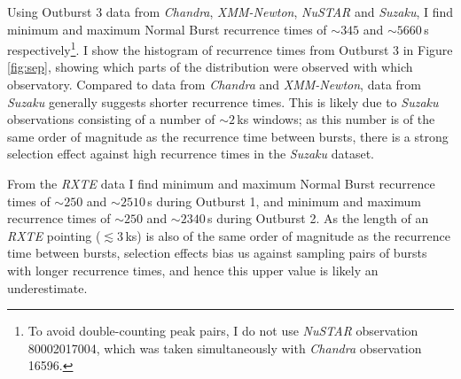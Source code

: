\par Using Outburst 3 data from \indexchandra\textit{Chandra}, \indexxmm\textit{XMM-Newton}, \indexnustar\textit{NuSTAR} and \indexsuzaku\textit{Suzaku}, I find minimum and maximum Normal Burst recurrence times of $\sim345$ and $\sim5660$\,s respectively\footnote{To avoid double-counting peak pairs, I do not use \textit{NuSTAR} observation 80002017004, which was taken simultaneously with \textit{Chandra} observation 16596.}.  I show the histogram of recurrence times from Outburst 3 in Figure \ref{fig:sep}, showing which parts of the distribution were observed with which observatory.  Compared to data from \textit{Chandra} and \textit{XMM-Newton}, data from \textit{Suzaku} generally suggests shorter recurrence times.  This is likely due to \textit{Suzaku} observations consisting of a number of $\sim2$\,ks windows; as this number is of the same order of magnitude as the recurrence time between bursts, there is a strong selection effect against high recurrence times in the \textit{Suzaku} dataset.
\par From the \indexrxte\textit{RXTE} data I find minimum and maximum Normal Burst recurrence times of $\sim250$ and $\sim2510$\,s during Outburst 1, and minimum and maximum recurrence times of $\sim250$ and $\sim2340$\,s during Outburst 2.  As the length of an \textit{RXTE} pointing ($\lesssim3$\,ks) is also of the same order of magnitude as the recurrence time between bursts, selection effects bias us against sampling pairs of bursts with longer recurrence times, and hence this upper value is likely an underestimate.

